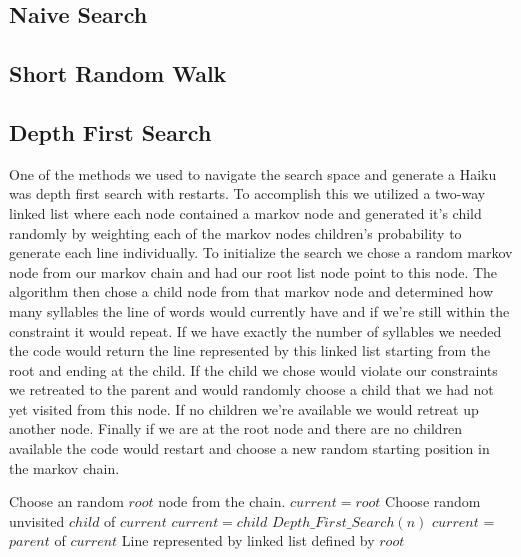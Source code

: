 \documentclass[]{article}
\begin{document}
\subsection{Naive Search}

\subsection{Short Random Walk}

\subsection{Depth First Search}
One of the methods we used to navigate the search space and generate a Haiku was depth first search with restarts. To accomplish this we utilized a two-way linked list where each node contained a markov node and generated it's child randomly by weighting each of the markov nodes children's probability to generate each line individually. To initialize the search we chose a random markov node from our markov chain and had our root list node point to this node. The algorithm then chose a child node from that markov node and determined how many syllables the line of words would currently have and if we're still within the constraint it would repeat. If we have exactly the number of syllables we needed the code would return the line represented by this linked list starting from the root and ending at the child. If the child we chose would violate our constraints we retreated to the parent and would randomly choose a child that we had not yet visited from this node. If no children we're available we would retreat up another node. Finally if we are at the root node and there are no children available the code would restart and choose a new random starting position in the markov chain.

\begin{algorithm}[H]
	\caption{$Depth\_First\_Search(n)$} \label{DFSB}
	\begin{algorithmic}[1]
		\State Choose an random $root$ node from the chain.
		\State $current = root$
				\State Choose random unvisited $child$ of $current$
					\State $current = child$
				\EndIf
			\Else
					\Return $Depth\_First\_Search(n)$
				\Else
					\State $current$ = $parent$ of $current$
				\EndIf
			\EndIf
		\EndWhile
		\Return Line represented by linked list defined by $root$
	\end{algorithmic}
\end{algorithm}
\end{document}
